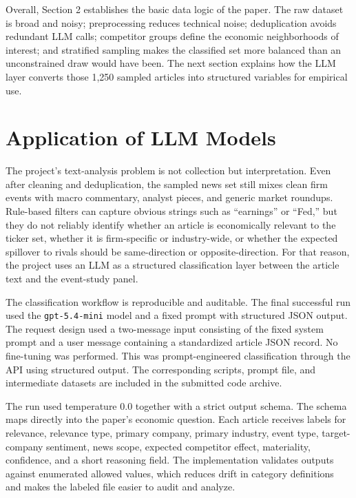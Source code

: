 \documentclass[11pt]{article}
\begin{document}
Overall, Section 2 establishes the basic data logic of the paper. The raw dataset is broad and noisy; preprocessing reduces technical noise; deduplication avoids redundant LLM calls; competitor groups define the economic neighborhoods of interest; and stratified sampling makes the classified set more balanced than an unconstrained draw would have been. The next section explains how the LLM layer converts those 1,250 sampled articles into structured variables for empirical use.

\section{Application of LLM Models}

The project's text-analysis problem is not collection but interpretation. Even after cleaning and deduplication, the sampled news set still mixes clean firm events with macro commentary, analyst pieces, and generic market roundups. Rule-based filters can capture obvious strings such as ``earnings'' or ``Fed,'' but they do not reliably identify whether an article is economically relevant to the ticker set, whether it is firm-specific or industry-wide, or whether the expected spillover to rivals should be same-direction or opposite-direction. For that reason, the project uses an LLM as a structured classification layer between the article text and the event-study panel.

The classification workflow is reproducible and auditable. The final successful run used the \texttt{gpt-5.4-mini} model and a fixed prompt with structured JSON output. The request design used a two-message input consisting of the fixed system prompt and a user message containing a standardized article JSON record. No fine-tuning was performed. This was prompt-engineered classification through the API using structured output. The corresponding scripts, prompt file, and intermediate datasets are included in the submitted code archive.

The run used temperature 0.0 together with a strict output schema. The schema maps directly into the paper's economic question. Each article receives labels for relevance, relevance type, primary company, primary industry, event type, target-company sentiment, news scope, expected competitor effect, materiality, confidence, and a short reasoning field. The implementation validates outputs against enumerated allowed values, which reduces drift in category definitions and makes the labeled file easier to audit and analyze.
\end{document}
